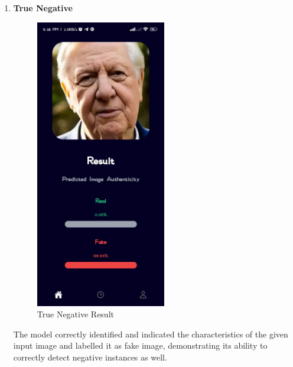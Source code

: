 \begin{enumerate}
    \item \textbf{True Negative}
          \\
          \begin{figure}[ht]
              \centering
              \includegraphics[height =5in ]{img/oldmanResult.jpg}
              \caption{{True Negative Result}}
          \end{figure}

          The model correctly identified and indicated the characteristics of the given input image and labelled it as fake image, demonstrating its ability to correctly detect negative instances as well.
          \newpage



\end{enumerate}
